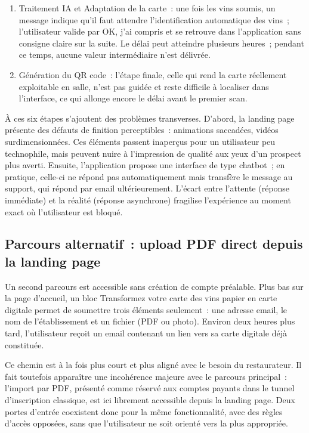 \documentclass[12pt, a4paper]{article}
\begin{document}
\begin{enumerate}[leftmargin=1.5em]
  \item Traitement IA et \og{}Adaptation de la carte\fg{}~: une fois les vins soumis,
        un message indique qu'il faut attendre l'identification automatique des vins~;
        l'utilisateur valide par \og{}OK, j'ai compris\fg{} et se retrouve dans l'application
        sans consigne claire sur la suite. Le délai peut atteindre plusieurs heures~; pendant
        ce temps, aucune valeur intermédiaire n'est délivrée.

  \item Génération du QR code~: l'étape finale, celle qui rend la carte réellement
        exploitable en salle, n'est pas guidée et reste difficile à localiser dans
        l'interface, ce qui allonge encore le délai avant le premier scan.
\end{enumerate}

À ces six étapes s'ajoutent des problèmes transverses. D'abord, la landing page présente
des défauts de finition perceptibles~: animations saccadées, vidéos surdimensionnées. Ces
éléments passent inaperçus pour un utilisateur peu technophile, mais peuvent nuire à
l'impression de qualité aux yeux d'un prospect plus averti. Ensuite, l'application propose une interface de type
chatbot~; en pratique, celle-ci ne répond pas automatiquement mais transfère le
message au support, qui répond par email ultérieurement. L'écart entre l'attente (réponse
immédiate) et la réalité (réponse asynchrone) fragilise l'expérience au moment exact où
l'utilisateur est bloqué.

\subsection{Parcours alternatif~: upload PDF direct depuis la landing page}

Un second parcours est accessible sans création de compte préalable. Plus bas sur la page
d'accueil, un bloc \og{}Transformez votre carte des vins papier en carte digitale\fg{} permet
de soumettre trois éléments seulement~: une adresse email, le nom de l'établissement et un
fichier (PDF ou photo). Environ deux heures plus tard, l'utilisateur reçoit un email contenant
un lien vers sa carte digitale déjà constituée.

Ce chemin est à la fois plus court et plus aligné avec le besoin du restaurateur. Il fait
toutefois apparaître une incohérence majeure avec le parcours
principal~: l'import par PDF, présenté comme réservé aux comptes payants dans le tunnel
d'inscription classique, est ici librement accessible depuis la landing page. Deux portes
d'entrée coexistent donc pour la même fonctionnalité, avec des règles d'accès opposées, sans
que l'utilisateur ne soit orienté vers la plus appropriée.
\end{document}
